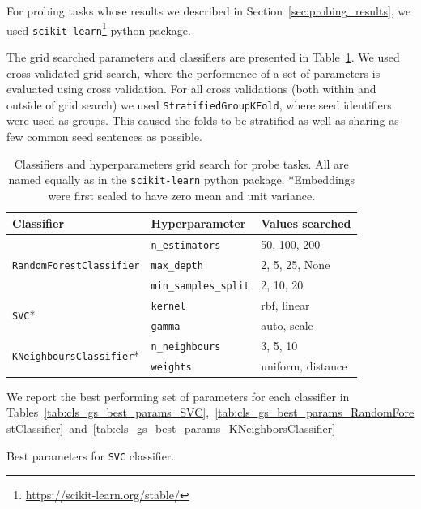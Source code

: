\documentclass[11pt]{article}
\newcommand{\Cls}[1]{\texttt{#1}}
\begin{document}
For probing tasks whose results we described in
Section~\ref{sec:probing_results}, we used
\texttt{scikit-learn}\footnote{\url{https://scikit-learn.org/stable/}} python
package.

The grid searched parameters and classifiers are presented in
Table~\ref{tab:cls_gs_all_params}. We used cross-validated grid search, where
the performence of a set of parameters is evaluated using cross validation. For
all cross validations (both within and outside of grid search) we used
\texttt{StratifiedGroupKFold}, where seed identifiers were used as groups. This
caused the folds to be stratified as well as sharing as few common seed
sentences as possible.

\begin{table}[htp]
  \centering

  \begin{tabular}{l l l}
    \toprule
    Classifier & Hyperparameter & Values searched \\
    \midrule
    \multirow{3}{13em}{\Cls{RandomForestClassifier}}
    & \texttt{n\_estimators} & 50, 100, 200 \\
    & \texttt{max\_depth} & 2, 5, 25, None \\
    & \texttt{min\_samples\_split} & 2, 10, 20 \\
    \midrule
    \multirow{2}{13em}{\Cls{SVC}*}
    & \texttt{kernel} & rbf, linear \\
    & \texttt{gamma} & auto, scale\\
    \midrule
    \multirow{2}{13em}{\Cls{KNeighboursClassifier}*}
    & \texttt{n\_neighbours} & 3, 5, 10\\
    & \texttt{weights} & uniform, distance\\
    \bottomrule
  \end{tabular}

  \caption{Classifiers and hyperparameters grid search for probe tasks. All are
  named equally as in the \texttt{scikit-learn} python package. *Embeddings
  were first scaled to have zero mean and unit
  variance.}\label{tab:cls_gs_all_params}

\end{table}

We report the best performing set of parameters for each classifier in
Tables~\ref{tab:cls_gs_best_params_SVC},~\ref{tab:cls_gs_best_params_RandomForestClassifier}~and~\ref{tab:cls_gs_best_params_KNeighborsClassifier}

\begin{table}[htp]
  \centering
  

  \caption{Best parameters for \Cls{SVC}
  classifier.}\label{tab:cls_gs_best_params_SVC}

\end{table}
\end{document}
